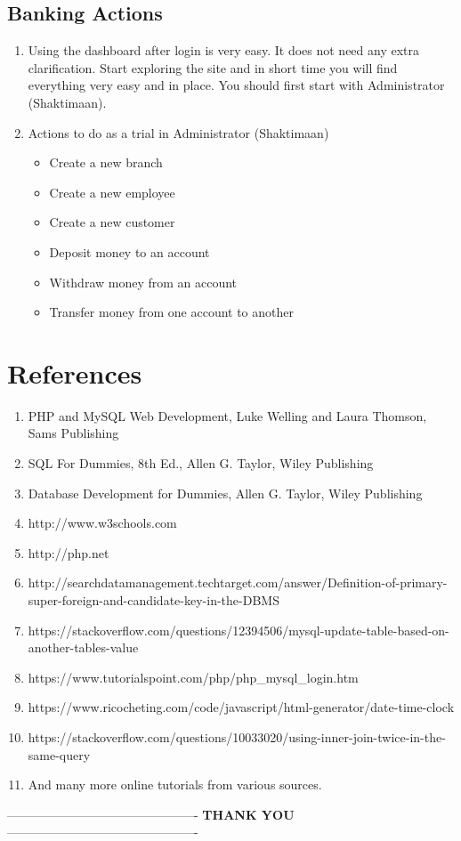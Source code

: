 \documentclass{article}
\begin{document}
 \subsection{Banking Actions}
 \begin{enumerate}
 \item Using the dashboard after login is very easy. It does not need any extra clarification. Start exploring the site and in short time you will find everything very easy and in place. You should first start with Administrator (Shaktimaan).
 \item Actions to do as a trial in Administrator (Shaktimaan)
    \begin{itemize}
    \item Create a new branch
    \item Create a new employee
    \item Create a new customer
    \item Deposit money to an account
    \item Withdraw money from an account
    \item Transfer money from one account to another
    \end{itemize}
 \end{enumerate}
 

\pagebreak
\section{References}
\begin{enumerate}
 \item PHP and MySQL Web Development, Luke Welling and Laura Thomson, Sams Publishing
 \item SQL For Dummies, 8th Ed., Allen G. Taylor, Wiley Publishing
 \item Database Development for Dummies, Allen G. Taylor, Wiley Publishing
 \item http://www.w3schools.com
 \item http://php.net
 \item http://searchdatamanagement.techtarget.com/answer/Definition-of-primary-super-foreign-and-candidate-key-in-the-DBMS
 \item https://stackoverflow.com/questions/12394506/mysql-update-table-based-on-another-tables-value
 \item https://www.tutorialspoint.com/php/php\_mysql\_login.htm
 \item https://www.ricocheting.com/code/javascript/html-generator/date-time-clock
 \item https://stackoverflow.com/questions/10033020/using-inner-join-twice-in-the-same-query
 \item And many more online tutorials from various sources.
\end{enumerate}
---------------------------------------------- \textbf{THANK YOU} ----------------------------------------------
\end{document}
